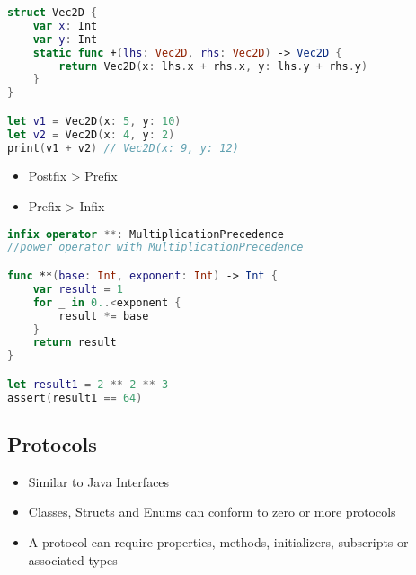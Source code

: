 \begin{breakbox}

\begin{lstlisting}[language=swift]
struct Vec2D {
    var x: Int
    var y: Int
    static func +(lhs: Vec2D, rhs: Vec2D) -> Vec2D {
        return Vec2D(x: lhs.x + rhs.x, y: lhs.y + rhs.y)
    }
}

let v1 = Vec2D(x: 5, y: 10)
let v2 = Vec2D(x: 4, y: 2)
print(v1 + v2) // Vec2D(x: 9, y: 12)
\end{lstlisting}
\end{breakbox}

\begin{breakbox}

\begin{itemize}
\tightlist
\item
  Postfix > Prefix
\item
  Prefix > Infix
\end{itemize}
\end{breakbox}

\begin{breakbox}


\begin{lstlisting}[language=swift]
infix operator **: MultiplicationPrecedence   
//power operator with MultiplicationPrecedence

func **(base: Int, exponent: Int) -> Int {
    var result = 1
    for _ in 0..<exponent {
        result *= base
    }
    return result
}

let result1 = 2 ** 2 ** 3
assert(result1 == 64)
\end{lstlisting}
\end{breakbox}

\columnbreak

\subsection{Protocols}
\begin{breakbox}

\begin{itemize}
\tightlist
\item
  Similar to Java Interfaces
\item
  Classes, Structs and Enums can conform to zero or more protocols
\item
  A protocol can require properties, methods, initializers, subscripts
  or associated types
\end{itemize}
\end{breakbox}


